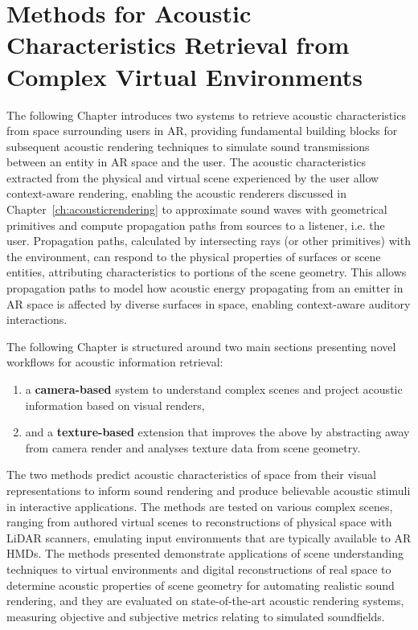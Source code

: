 \chapter{Methods for Acoustic Characteristics Retrieval from Complex Virtual Environments} %
\label{ch:Materials}
The following Chapter introduces two systems to retrieve acoustic characteristics from space surrounding users in AR, providing fundamental building blocks for subsequent acoustic rendering techniques to simulate sound transmissions between an entity in AR space and the user. The acoustic characteristics extracted from the physical and virtual scene experienced by the user allow context-aware rendering, enabling the acoustic renderers discussed in Chapter~\ref{ch:acousticrendering} to approximate sound waves with geometrical primitives and compute propagation paths from sources to a listener, i.e. the user. Propagation paths, calculated by intersecting rays (or other primitives) with the environment, can respond to the physical properties of surfaces or scene entities, attributing characteristics to portions of the scene geometry. This allows propagation paths to model how acoustic energy propagating from an emitter in AR space is affected by diverse surfaces in space, enabling context-aware auditory interactions. \par
The following Chapter is structured around two main sections presenting novel workflows for acoustic information retrieval:
\begin{enumerate}
    \item a \textbf{camera-based} system to understand complex scenes and project acoustic information based on visual renders,
    \item and a \textbf{texture-based} extension that improves the above by abstracting away from camera render and analyses texture data from scene geometry.
\end{enumerate}
The two methods predict acoustic characteristics of space from their visual representations to inform sound rendering and produce believable acoustic stimuli in interactive applications. The methods are tested on various complex scenes, ranging from authored virtual scenes to reconstructions of physical space with LiDAR scanners, emulating input environments that are typically available to AR HMDs. The methods presented demonstrate applications of scene understanding techniques to virtual environments and digital reconstructions of real space to determine acoustic properties of scene geometry for automating realistic sound rendering, and they are evaluated on state-of-the-art acoustic rendering systems, measuring objective and subjective metrics relating to simulated soundfields. \par

